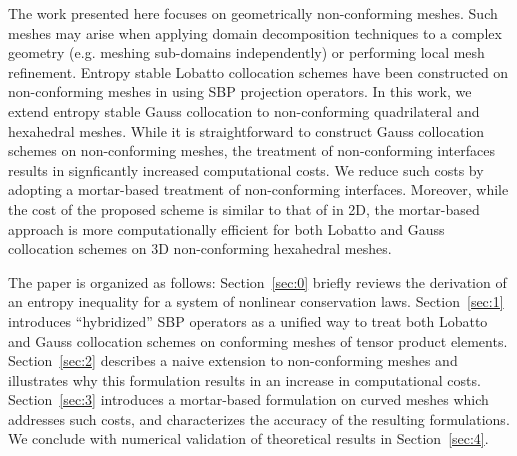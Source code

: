 \documentclass{svjour3}                     %
\begin{document}
The work presented here focuses on geometrically non-conforming meshes.  Such meshes may arise when applying domain decomposition techniques to a complex geometry (e.g. meshing sub-domains independently)  \cite{bernardi1993domain} or performing local mesh refinement.  Entropy stable Lobatto collocation schemes have been constructed on non-conforming meshes in \cite{friedrich2017entropy} using SBP projection operators.  In this work, we extend entropy stable Gauss collocation to non-conforming quadrilateral and hexahedral meshes.  While it is straightforward to construct Gauss collocation schemes on non-conforming meshes, the treatment of non-conforming interfaces results in signficantly increased computational costs.  We reduce such costs by adopting a mortar-based treatment of non-conforming interfaces.  Moreover, while the cost of the proposed scheme is similar to that of  \cite{friedrich2017entropy} in 2D, the mortar-based approach is more computationally efficient for both Lobatto and Gauss collocation schemes on 3D non-conforming hexahedral meshes.  

The paper is organized as follows: Section~\ref{sec:0} briefly reviews the derivation of an entropy inequality for a system of nonlinear conservation laws.  Section~\ref{sec:1} introduces ``hybridized'' SBP operators as a unified way to treat both Lobatto and Gauss collocation schemes on conforming meshes of tensor product elements.  Section~\ref{sec:2} describes a naive extension to non-conforming meshes and illustrates why this formulation results in an increase in computational costs.  Section~\ref{sec:3} introduces a mortar-based formulation on curved meshes which addresses such costs, and characterizes the accuracy of the resulting formulations.  We conclude with numerical validation of theoretical results in Section~\ref{sec:4}.  
\end{document}
